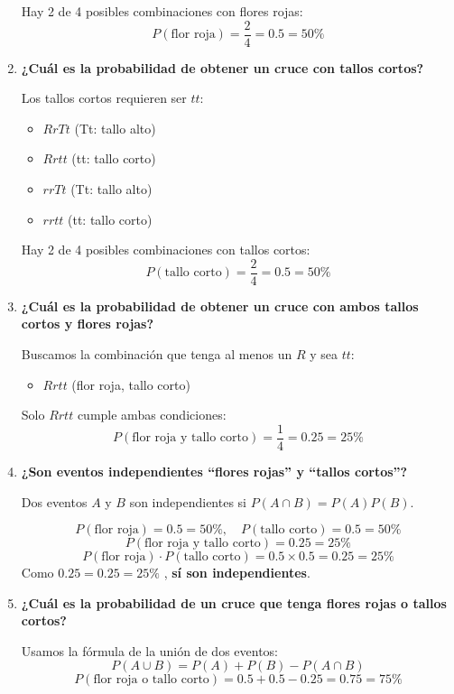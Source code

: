 \documentclass{article}
\begin{document}
\begin{enumerate}[label=\alph*)]
    Hay 2 de 4 posibles combinaciones con flores rojas:
    \[
    P(\text{flor roja}) = \frac{2}{4} = 0.5 = 50\%
    \]

    \item \textbf{¿Cuál es la probabilidad de obtener un cruce con tallos cortos?}

    Los tallos cortos requieren ser $tt$:
    \begin{itemize}
        \item $RrTt$ (Tt: tallo alto)
        \item $Rrtt$ (tt: tallo corto)
        \item $rrTt$ (Tt: tallo alto)
        \item $rrtt$ (tt: tallo corto)
    \end{itemize}

    Hay 2 de 4 posibles combinaciones con tallos cortos:
    \[
    P(\text{tallo corto}) = \frac{2}{4} = 0.5 = 50\%
    \]

    \item \textbf{¿Cuál es la probabilidad de obtener un cruce con ambos tallos cortos y flores rojas?}

    Buscamos la combinación que tenga al menos un $R$ y sea $tt$:
    \begin{itemize}
        \item $Rrtt$ (flor roja, tallo corto)
    \end{itemize}

    Solo $Rrtt$ cumple ambas condiciones:
    \[
    P(\text{flor roja y tallo corto}) = \frac{1}{4} = 0.25 = 25\%
    \]

    \item \textbf{¿Son eventos independientes ``flores rojas'' y ``tallos cortos''?}

    Dos eventos $A$ y $B$ son independientes si $P(A \cap B) = P(A)P(B)$.

    \[
    P(\text{flor roja}) = 0.5 = 50\% ,\quad P(\text{tallo corto}) = 0.5 = 50\%
    \]
    \[
    P(\text{flor roja y tallo corto}) = 0.25 = 25\%
    \]
    \[
    P(\text{flor roja}) \cdot P(\text{tallo corto}) = 0.5 \times 0.5 = 0.25 = 25\%
    \]
    Como $0.25 = 0.25 = 25\%$ , \textbf{sí son independientes}.

    \item \textbf{¿Cuál es la probabilidad de un cruce que tenga flores rojas o tallos cortos?}

    Usamos la fórmula de la unión de dos eventos:
    \[
    P(A \cup B) = P(A) + P(B) - P(A \cap B)
    \]
    \[
    P(\text{flor roja o tallo corto}) = 0.5 + 0.5 - 0.25 = 0.75  = 75\%
    \]


\end{enumerate}
\end{document}

